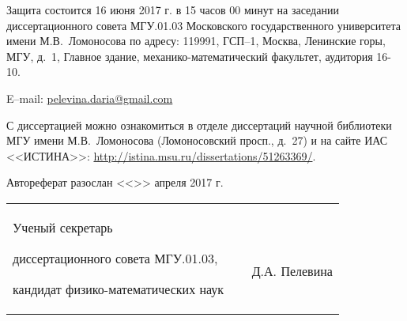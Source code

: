 \documentclass[a4paper,14pt,
russcorr,
oneside]{extbook}
\begin{document}
\noindent Защита состоится 16 июня 2017 г. в 15 часов 00 минут на
заседании диссертационного совета МГУ.01.03 Московского
государственного университета имени М.В.~Ломоносова по адресу:
119991, ГСП--1, Москва, Ленинские горы, МГУ, д.~1, Главное здание, механико-математический
факультет, аудитория 16-10.

\vsp

\noindent E--mail: \href{pelevina.daria@gmail.com}{pelevina.daria@gmail.com}

\vsp

\noindent С диссертацией можно ознакомиться в отделе диссертаций научной библиотеки МГУ имени М.В.~Ломоносова (Ломоносовский просп., д.~27) и на сайте ИАС <<ИСТИНА>>: \url{http://istina.msu.ru/dissertations/51263369/}.

\vsp

\noindent Автореферат разослан <<\underline{\hspace{1.0cm}}>> апреля 2017 г.

\vsp

\vfill

\noindent\begin{tabular}{@{}p{10cm}@{}p{4cm}@{}p{3.5cm}@{}}
Ученый секретарь

диссертационного совета МГУ.01.03,

кандидат физико-математических наук
 &
$\:$

 &
$\:$

$\:$

\raggedleft  Д.А. Пелевина\\
\end{tabular}

\newpage




\end{document}

